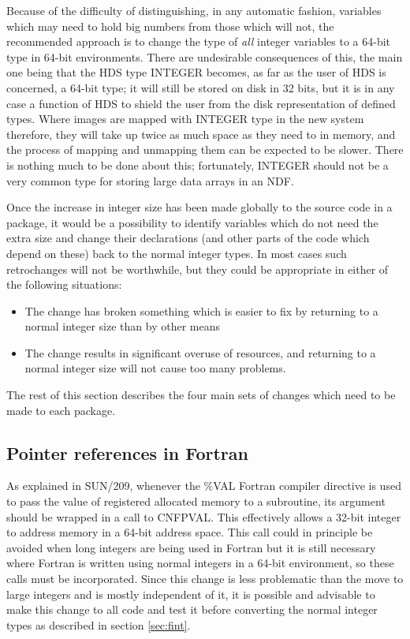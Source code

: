 \documentclass[twoside,11pt]{article}
\newcommand{\xref}[3]{#1}
\renewcommand{\_}{\texttt{\symbol{95}}}
\begin{document}
Because of the difficulty of distinguishing, in any automatic fashion,
variables which may 
need to hold big numbers from those which will not,
the recommended approach is to change the type of {\em all\/} 
integer variables to a 64-bit type in 64-bit environments.
There are undesirable consequences of this,
the main one being that 
the HDS type \_INTEGER becomes, as far as the user of HDS is concerned,
a 64-bit type;
it will still be stored on disk in 32 bits, but it is in any case a
function of HDS to shield the user from the disk representation
of defined types.
Where images are mapped with \_INTEGER type in the new system therefore, 
they will take up twice as much space as they need to in memory,
and the process of mapping and unmapping them can be expected to be slower.
There is nothing much to be done about this;
fortunately, \_INTEGER should not be a very common type for
storing large data arrays in an NDF.

Once the increase in integer size has been made 
globally to the source code in a package,
it would be a possibility 
to identify variables which do not need the extra size
and change their declarations (and other parts of the code which depend
on these) back to the normal integer types.
In most cases such retrochanges will not be worthwhile, 
but they could be appropriate in either of the following situations:
\begin{itemize}
\item
The change has broken something which is easier to fix by returning to 
a normal integer size than by other means
\item
The change results in significant overuse of resources, 
and returning to a normal
integer size will not cause too many problems.
\end{itemize}

The rest of this section describes the four main sets of changes
which need to be made to each package.

\subsection{Pointer references in Fortran}

As explained in \xref{SUN/209}{sun209}{pointers},
whenever the \%VAL Fortran compiler directive 
is used to pass the value of registered allocated
memory to a subroutine, its argument should be wrapped in a call
to \xref{CNF\_PVAL}{sun209}{CNF\_PVAL}.  This effectively allows
a 32-bit integer to address memory in a 64-bit address space.
This call could in principle be avoided 
when long integers are being used in Fortran
but it is still 
necessary where Fortran is written using normal integers in a
64-bit environment,
so these calls must be incorporated.
Since this change is less problematic than the move to large integers
and is mostly independent of it,
it is possible and advisable to make this
change to all code and test it before converting the normal integer types
as described in section \ref{sec:fint}.  
\end{document}
